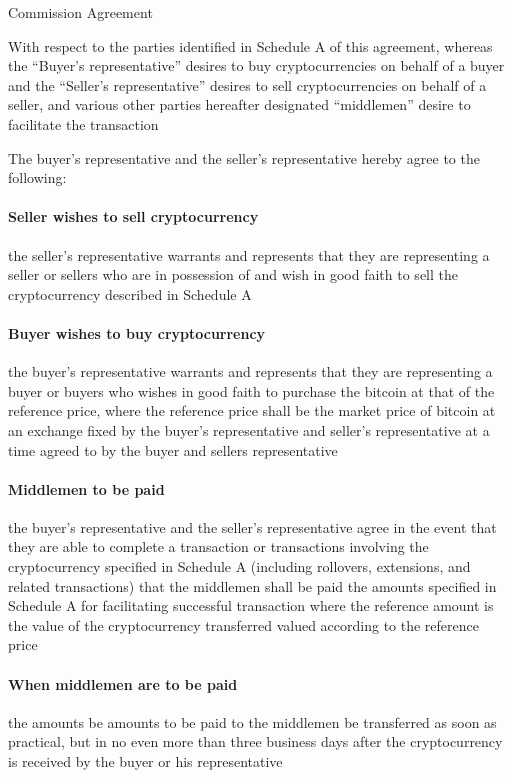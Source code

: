 \documentclass[10pt]{article}
\begin{document}
\begin{center}
{\Large Commission Agreement}
\end{center}

With respect to the parties identified in Schedule A of this
agreement, whereas the “Buyer’s representative” desires to buy
cryptocurrencies on behalf of a buyer and the “Seller’s
representative” desires to sell cryptocurrencies on behalf of a
seller, and various other parties hereafter designated “middlemen”
desire to facilitate the transaction

The buyer’s representative and the seller’s representative hereby
agree to the following:

\paragraph{Seller wishes to sell cryptocurrency} the seller’s
representative warrants and represents that they are representing a
seller or sellers who are in possession of and wish in good faith to
sell the cryptocurrency described in Schedule A

\paragraph{Buyer wishes to buy cryptocurrency} the buyer’s representative warrants and represents that they are representing a buyer or buyers who wishes in good faith to purchase the bitcoin at that  of the reference price, where the reference price shall be the market price of bitcoin at an exchange fixed by the buyer’s representative and seller’s representative at a time agreed to by the buyer and sellers representative

\paragraph{Middlemen to be paid} the buyer’s representative and the
seller's representative agree in the event that they are able to
complete a transaction or transactions involving the cryptocurrency
specified in Schedule A (including rollovers, extensions, and related
transactions) that the middlemen shall be paid the amounts specified
in Schedule A for facilitating successful transaction where the
reference amount is the value of the cryptocurrency transferred valued
according to the reference price

\paragraph{When middlemen are to be paid} the amounts be amounts to be
paid to the middlemen be transferred as soon as practical, but in no
even more than three business days after the cryptocurrency is
received by the buyer or his representative
\end{document}
